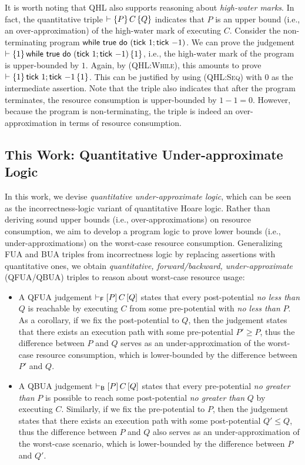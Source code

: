 It is worth noting that QHL also supports reasoning about \emph{high-water marks}.
%
In fact, the quantitative triple $\vdash\left\{P\right\}C\left\{Q\right\}$ indicates that $P$ is an upper bound (i.e., an over-approximation) of the high-water mark of executing $C$.
%
Consider the non-terminating program $\textsf{while}~\mathsf{true}~\textsf{do}~(\textsf{tick}~1; \textsf{tick}~{-1})$.
%
We can prove the judgement $\vdash\left\{1\right\}\textsf{while}~\mathsf{true}~\textsf{do}~(\textsf{tick}~1;\textsf{tick}~{-1})\left\{1\right\}$, i.e., the high-water mark of the program is upper-bounded by $1$.
%
Again, by \textsc{(QHL:While)}, this amounts to prove $\vdash\left\{1\right\}\textsf{tick}~1; \textsf{tick}~{-1}\left\{1\right\}$.
%
This can be justified by using \textsc{(QHL:Seq)} with $0$ as the intermediate assertion.
%
Note that the triple also indicates that after the program terminates, the resource consumption is upper-bounded by $1-1=0$.
%
However, because the program is non-terminating, the triple is indeed an over-approximation in terms of resource consumption.

\subsection{This Work: Quantitative Under-approximate Logic}
\label{sec:overview:qual}

In this work, we devise \emph{quantitative under-approximate logic}, which can be seen as the incorrectness-logic variant of quantitative Hoare logic.
%
Rather than deriving sound upper bounds (i.e., over-approximations) on resource consumption, we aim to develop a program logic to prove lower bounds (i.e., under-approximations) on the worst-case resource consumption.
%
Generalizing FUA and BUA triples from incorrectness logic by replacing assertions with quantitative ones, we obtain \emph{quantitative, forward/backward, under-approximate} (QFUA/QBUA) triples to reason about worst-case resource usage:
\begin{itemize}
  \item A QFUA judgement $\vdash_{\mathsf{F}}\left[P\right]C\left[Q\right]$ states that every post-potential \emph{no less than} $Q$ is reachable by executing $C$ from some pre-potential with \emph{no less than} $P$.
  As a corollary, if we fix the post-potential to $Q$, then the judgement states that there exists an execution path with some pre-potential $P' \ge P$,  thus the difference between $P$ and $Q$ serves as an under-approximation of the worst-case resource consumption, which is lower-bounded by the difference between $P'$ and $Q$.
  \item A QBUA judgement $\vdash_{\mathsf{B}}\left[P\right]C\left[Q\right]$ states that every pre-potential \emph{no greater than} $P$ is possible to reach some post-potential \emph{no greater than} $Q$ by executing $C$.
  Similarly, if we fix the pre-potential to $P$, then the judgement states that there exists an execution path with some post-potential $Q' \le Q$, thus the difference between $P$ and $Q$ also serves as an under-approximation of the worst-case scenario, which is lower-bounded by the difference between $P$ and $Q'$.
\end{itemize}

